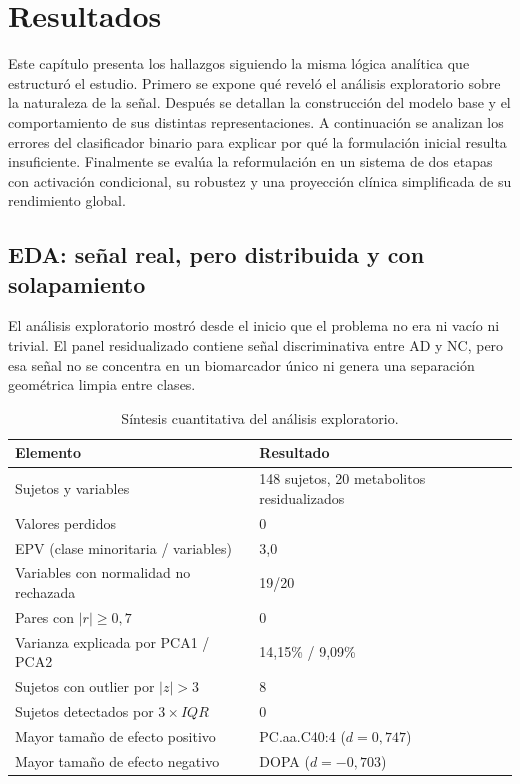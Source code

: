 \chapter{Resultados}\label{chap:resultados}

Este capítulo presenta los hallazgos siguiendo la misma lógica analítica que estructuró el estudio. Primero se expone qué reveló el análisis exploratorio sobre la naturaleza de la señal. Después se detallan la construcción del modelo base y el comportamiento de sus distintas representaciones. A continuación se analizan los errores del clasificador binario para explicar por qué la formulación inicial resulta insuficiente. Finalmente se evalúa la reformulación en un sistema de dos etapas con activación condicional, su robustez y una proyección clínica simplificada de su rendimiento global.

\section{EDA: señal real, pero distribuida y con solapamiento}\label{sec:eda}

El análisis exploratorio mostró desde el inicio que el problema no era ni vacío ni trivial. El panel residualizado contiene señal discriminativa entre AD y NC, pero esa señal no se concentra en un biomarcador único ni genera una separación geométrica limpia entre clases.

\begin{table}[ht]
\centering
\caption{Síntesis cuantitativa del análisis exploratorio.}
\label{tab:eda_synthesis_results}
\begin{tabular}{ll}
\hline
\textbf{Elemento} & \textbf{Resultado} \\
\hline
Sujetos y variables & 148 sujetos, 20 metabolitos residualizados \\
Valores perdidos & 0 \\
EPV (clase minoritaria / variables) & 3,0 \\
Variables con normalidad no rechazada & 19/20 \\
Pares con $|r|\geq 0{,}7$ & 0 \\
Varianza explicada por PCA1 / PCA2 & 14,15\% / 9,09\% \\
Sujetos con outlier por $|z|>3$ & 8 \\
Sujetos detectados por $3\times IQR$ & 0 \\
Mayor tamaño de efecto positivo & PC.aa.C40:4 ($d = 0{,}747$) \\
Mayor tamaño de efecto negativo & DOPA ($d = -0{,}703$) \\
\hline
\end{tabular}
\end{table}

